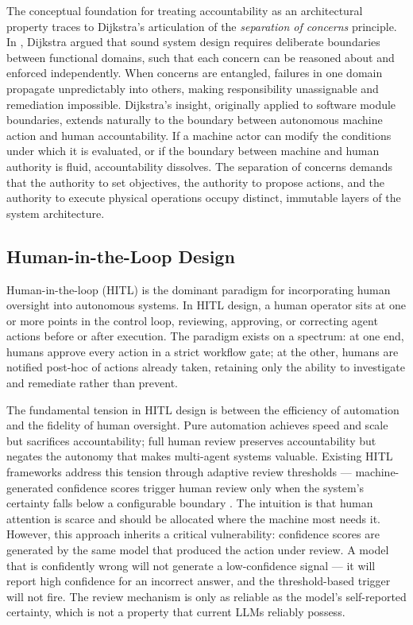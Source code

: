 The conceptual foundation for treating accountability as an architectural property traces to Dijkstra's articulation of the \textit{separation of concerns} principle. In \cite{dijkstra1982}, Dijkstra argued that sound system design requires deliberate boundaries between functional domains, such that each concern can be reasoned about and enforced independently. When concerns are entangled, failures in one domain propagate unpredictably into others, making responsibility unassignable and remediation impossible. Dijkstra's insight, originally applied to software module boundaries, extends naturally to the boundary between autonomous machine action and human accountability. If a machine actor can modify the conditions under which it is evaluated, or if the boundary between machine and human authority is fluid, accountability dissolves. The separation of concerns demands that the authority to set objectives, the authority to propose actions, and the authority to execute physical operations occupy distinct, immutable layers of the system architecture.

\subsection{Human-in-the-Loop Design}

Human-in-the-loop (HITL) is the dominant paradigm for incorporating human oversight into autonomous systems. In HITL design, a human operator sits at one or more points in the control loop, reviewing, approving, or correcting agent actions before or after execution. The paradigm exists on a spectrum: at one end, humans approve every action in a strict workflow gate; at the other, humans are notified post-hoc of actions already taken, retaining only the ability to investigate and remediate rather than prevent.

The fundamental tension in HITL design is between the efficiency of automation and the fidelity of human oversight. Pure automation achieves speed and scale but sacrifices accountability; full human review preserves accountability but negates the autonomy that makes multi-agent systems valuable. Existing HITL frameworks address this tension through adaptive review thresholds --- machine-generated confidence scores trigger human review only when the system's certainty falls below a configurable boundary \cite{bansal2019}. The intuition is that human attention is scarce and should be allocated where the machine most needs it. However, this approach inherits a critical vulnerability: confidence scores are generated by the same model that produced the action under review. A model that is confidently wrong will not generate a low-confidence signal --- it will report high confidence for an incorrect answer, and the threshold-based trigger will not fire. The review mechanism is only as reliable as the model's self-reported certainty, which is not a property that current LLMs reliably possess.

